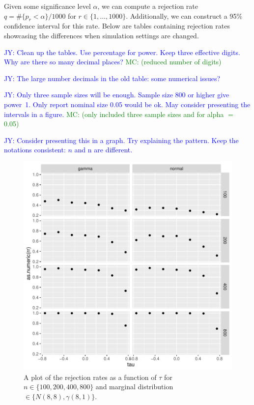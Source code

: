 \documentclass[12pt, titlepage, letterpaper]{article}
\newcommand{\jy}[1]{\textcolor{blue}{JY: #1}}
\newcommand{\mc}[1]{\textcolor{green}{MC: (#1)}}
\begin{document}
{Given some significance level $\alpha$, we can compute a rejection rate 
$q = \#\{p_r < \alpha\} / 1000$ for $r \in \{1, \ldots, 1000\}$.
Additionally, we can construct a 95\% confidence interval for 
this rate. Below are tables containing rejection rates showcasing the 
differences when simulation settings are changed.

\jy{Clean up the tables. Use percentage for power. Keep three effective
  digits. Why are there so many decimal places? }
\mc{reduced number of digits}

\jy{The large number decimals in the old table: some numerical issues?}

\jy{Only three sample sizes will be enough. Sample size 800 or higher give
  power~1. Only report nominal size 0.05 would be ok. May consider presenting
  the intervals in a figure.}
\mc{only included three sample sizes and for alpha $=$ 0.05}


\jy{Consider presenting this in a graph. Try explaining the pattern.
  Keep the notations consistent: $n$ and n are different.}


\begin{figure}[tbp]
  \centering
  \includegraphics[scale=1]{figures/rr}
  \caption{A plot of the rejection rates as a function of $\tau$ for
 $n \in \{100, 200, 400, 800\}$ and marginal distribution 
 $\in \{N(8,8), \gamma(8,1)\}$.}
  \label{fig:rr}
\end{figure}


}
\end{document}
